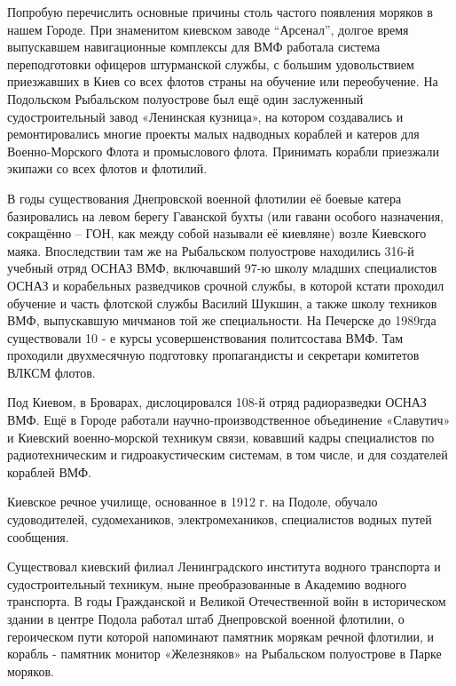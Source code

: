 
Попробую перечислить основные причины столь частого появления
моряков в нашем Городе. При знаменитом киевском заводе \enquote{Арсенал}, долгое время
выпускавшем навигационные комплексы для ВМФ работала система переподготовки
офицеров штурманской службы, с большим удовольствием приезжавших в Киев со всех
флотов страны на обучение или переобучение. На Подольском Рыбальском
полуострове был ещё один заслуженный судостроительный завод «Ленинская
кузница», на котором создавались и ремонтировались многие проекты малых
надводных кораблей и катеров для Военно-Морского Флота и промыслового флота.
Принимать корабли приезжали экипажи со всех флотов и флотилий. 


В годы
существования Днепровской военной флотилии её боевые катера базировались на
левом берегу Гаванской бухты (или гавани особого назначения, сокращённо – ГОН,
как между собой называли её киевляне) возле Киевского маяка. Впоследствии там
же на Рыбальском полуострове находились 316-й учебный отряд ОСНАЗ ВМФ,
включавший 97-ю школу младших специалистов ОСНАЗ и корабельных разведчиков
срочной службы, в которой кстати проходил обучение и часть флотской службы
Василий Шукшин, а также школу техников ВМФ, выпускавшую мичманов той же
специальности. На Печерске до 1989гда существовали 10 - е курсы
усовершенствования политсостава ВМФ. Там проходили двухмесячную подготовку
пропагандисты и секретари комитетов ВЛКСМ флотов. 


Под Киевом, в Броварах,
дислоцировался 108-й отряд радиоразведки ОСНАЗ ВМФ. Ещё в Городе работали
научно-производственное объединение «Славутич» и Киевский военно-морской
техникум связи, ковавший кадры специалистов по радиотехническим и
гидроакустическим системам, в том числе, и для создателей кораблей ВМФ.


Киевское речное училище, основанное в 1912 г. на Подоле, обучало судоводителей,
судомехаников, электромехаников, специалистов водных путей сообщения.

Существовал киевский филиал Ленинградского института водного транспорта и
судостроительный техникум, ныне преобразованные в Академию водного транспорта.
В годы Гражданской и Великой Отечественной войн в историческом здании в центре
Подола работал штаб Днепровской военной флотилии, о героическом пути которой
напоминают памятник морякам речной флотилии, и корабль - памятник монитор
«Железняков» на Рыбальском полуострове в Парке моряков. 


